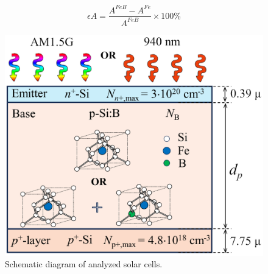 \documentclass[a4paper,fleqn]{cas-sc}
\begin{document}
%
%
%
\begin{equation}
    \epsilon A = \frac{A^{FeB} - A^{Fe}}{A^{FeB}} \times 100 \%
\end{equation}
%
%
%
%
\begin{figure}
	\centering
		\includegraphics[scale=.80]{Figure1.png}
	  \caption{Schematic diagram of analyzed solar cells.}\label{fig1}
\end{figure}
\end{document}
